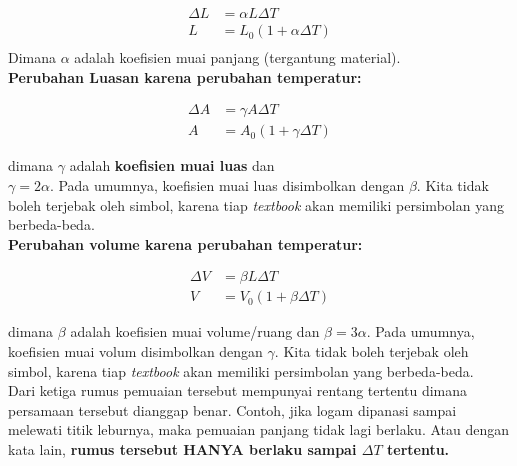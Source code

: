 \documentclass[twocolumn, 11pt]{article}%
\begin{document}
        \begin{equation*}
           \begin{split}
               \Delta L &= \alpha L \Delta T\\
               L &= L_0 (1+\alpha \Delta T)\\
           \end{split} 
        \end{equation*}
        Dimana $\alpha$ adalah koefisien muai panjang (tergantung material).\\

        \textbf{Perubahan Luasan karena perubahan temperatur:}

        \begin{equation*}
           \begin{split}
               \Delta A &= \gamma A \Delta T\\
               A &= A_0 (1+ \gamma \Delta T)
           \end{split} 
        \end{equation*}

        dimana $\gamma$ adalah \textbf{koefisien muai luas} dan\\
        $\gamma = 2 \alpha$. Pada umumnya, koefisien muai luas disimbolkan dengan $\beta$. Kita tidak boleh terjebak oleh simbol, karena tiap \textit{textbook} akan memiliki persimbolan yang berbeda-beda.\\

        \textbf{Perubahan volume karena perubahan temperatur:}

        \begin{equation*}
            \begin{split}
                \Delta V &= \beta L \Delta T \\
                V &= V_0 (1+ \beta \Delta T)
           \end{split} 
        \end{equation*}

        dimana $\beta$ adalah koefisien muai volume/ruang dan $\beta = 3 \alpha$. Pada umumnya, koefisien muai volum disimbolkan dengan $\gamma$. Kita tidak boleh terjebak oleh simbol, karena tiap \textit{textbook} akan memiliki persimbolan yang berbeda-beda.\\


        Dari ketiga rumus pemuaian tersebut mempunyai rentang tertentu dimana persamaan tersebut dianggap benar. Contoh, jika logam dipanasi sampai melewati titik leburnya, maka pemuaian panjang tidak lagi berlaku. Atau dengan kata lain, \textbf{rumus tersebut HANYA berlaku sampai $\Delta T$ tertentu.}\\
\end{document}
